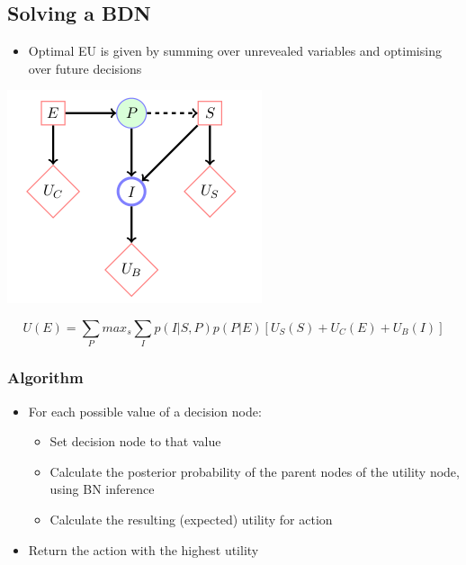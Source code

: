 \subsection{Solving a BDN}
\begin{frame}
\begin{itemize}
\item Optimal EU is given by summing over unrevealed variables and optimising over future decisions
\end{itemize}

\includegraphics[width=.5\textwidth]{figures/bdn}

\begin{equation}
U(E) = \sum\limits_{P}max_s\sum\limits_{I}p(I|S,P)p(P|E)[U_S(S)+U_C(E)+U_B(I)]
\end{equation}
\end{frame}

\begin{frame}
\frametitle{Algorithm}
\begin{itemize}
	\item For each possible value of a decision node:
	\begin{itemize}
	\item Set decision node to that value
	\item Calculate the posterior probability of the parent nodes
		of the utility node, using BN inference
	\item Calculate the resulting (expected) utility for action
	\end{itemize}
	\item Return the action with the highest utility
\end{itemize}
\end{frame}

